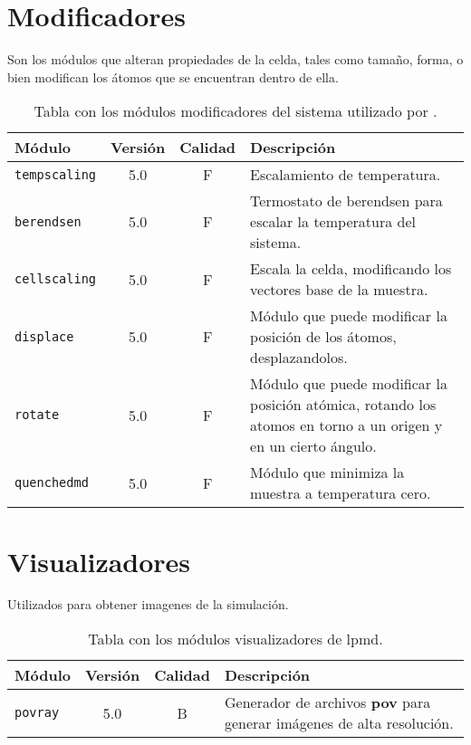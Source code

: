 \section{Modificadores}
Son los m\'odulos que alteran propiedades de la celda, tales como tama\~no, forma, o bien modifican los \'atomos que se encuentran dentro de ella.
\begin{table}[h!]
 \begin{tabular}{|l|c|c|p{10cm}|}\hline
 M\'odulo & Versi\'on & Calidad & Descripci\'on \\
 \hline\hline
 \texttt{tempscaling} & 5.0 & F & Escalamiento de temperatura.\\
 \hline
 \texttt{berendsen} & 5.0 & F & Termostato de berendsen para escalar la temperatura del sistema.\\
 \hline
 \texttt{cellscaling} & 5.0 & F & Escala la celda, modificando los vectores base de la muestra.\\
 \hline
 \texttt{displace} & 5.0 & F & M\'odulo que puede modificar la posici\'on de los \'atomos, desplazandolos.\\
 \hline
 \texttt{rotate} & 5.0 & F & M\'odulo que puede modificar la posici\'on at\'omica, rotando los atomos en torno a un origen y en un cierto \'angulo.\\
 \hline
 \texttt{quenchedmd} & 5.0 & F & M\'odulo que minimiza la muestra a temperatura cero.\\
 \hline
 \end{tabular}
\label{tab:modmodify}
\caption{Tabla con los m\'odulos modificadores del sistema utilizado por \lpmd.}
\end{table}

\section{Visualizadores}
Utilizados para obtener imagenes de la simulaci\'on.

\begin{table}[h!]
 \begin{tabular}{|l|c|c|p{10cm}|}\hline
 M\'odulo & Versi\'on & Calidad & Descripci\'on \\
 \hline\hline
 \texttt{povray} & 5.0 & B & Generador de archivos \textbf{pov} para generar im\'agenes de alta resoluci\'on.\\
 \hline
 \end{tabular}
\label{tab:modgvisual}
\caption{Tabla con los m\'odulos visualizadores de lpmd.}
\end{table}


